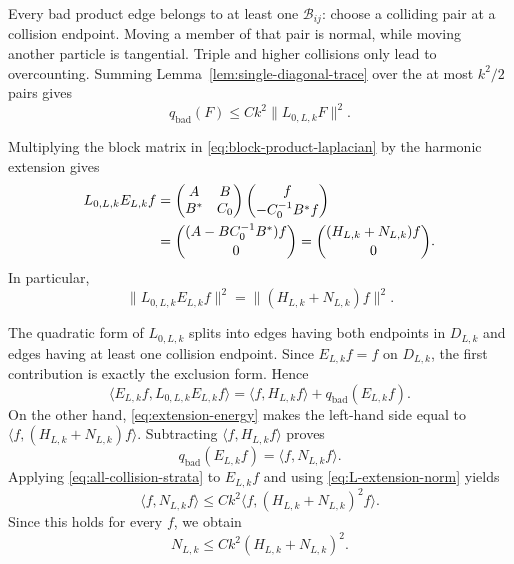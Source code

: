 \documentclass[11pt]{article}
\numberwithin{equation}{section}
\theoremstyle{remark}
\newcommand{\1}{\mathbf 1}
\begin{document}
Every bad product edge belongs to at least one \(\mathcal B_{ij}\): choose
a colliding pair at a collision endpoint.  Moving a member of that pair is
normal, while moving another particle is tangential.  Triple and higher
collisions only lead to overcounting.  Summing
Lemma~\ref{lem:single-diagonal-trace} over the at most \(k^2/2\) pairs gives
\begin{equation}
 q_{\mathrm{bad}}(F)
 \leq Ck^2\|L_{0,L,k}F\|^2.
 \label{eq:all-collision-strata}
\end{equation}

Multiplying the block matrix in
\eqref{eq:block-product-laplacian} by the harmonic extension gives
\begin{align}
 L_{0,L,k}E_{L,k}f
 &=
 \begin{pmatrix}A&B\\B^*&C_0\end{pmatrix}
 \binom{f}{-C_0^{-1}B^*f} \notag\\
 &=\binom{(A-BC_0^{-1}B^*)f}{0}
 =\binom{(H_{L,k}+N_{L,k})f}{0}.
 \label{eq:L-on-harmonic-extension}
\end{align}
In particular,
\begin{equation}
 \|L_{0,L,k}E_{L,k}f\|^2
 =\|(H_{L,k}+N_{L,k})f\|^2.
 \label{eq:L-extension-norm}
\end{equation}

The quadratic form of \(L_{0,L,k}\) splits into edges having both
endpoints in \(D_{L,k}\) and edges having at least one collision endpoint.
Since \(E_{L,k}f=f\) on \(D_{L,k}\), the first contribution is exactly the
exclusion form.  Hence
\begin{equation}
 \langle E_{L,k}f,L_{0,L,k}E_{L,k}f\rangle
 =\langle f,H_{L,k}f\rangle+q_{\mathrm{bad}}(E_{L,k}f).
 \label{eq:extension-good-bad-splitting}
\end{equation}
On the other hand, \eqref{eq:extension-energy} makes the left-hand side
equal to \(\langle f,(H_{L,k}+N_{L,k})f\rangle\).  Subtracting
\(\langle f,H_{L,k}f\rangle\) proves
\begin{equation}
 q_{\mathrm{bad}}(E_{L,k}f)=\langle f,N_{L,k}f\rangle.
 \label{eq:N-as-bad-energy}
\end{equation}
Applying \eqref{eq:all-collision-strata} to \(E_{L,k}f\) and using
\eqref{eq:L-extension-norm} yields
\[
 \langle f,N_{L,k}f\rangle
 \leq Ck^2\langle f,(H_{L,k}+N_{L,k})^2f\rangle.
\]
Since this holds for every \(f\), we obtain
\begin{equation}
 N_{L,k}\leq Ck^2(H_{L,k}+N_{L,k})^2.
 \label{eq:quadratic-N-prebound}
\end{equation}
\end{document}

